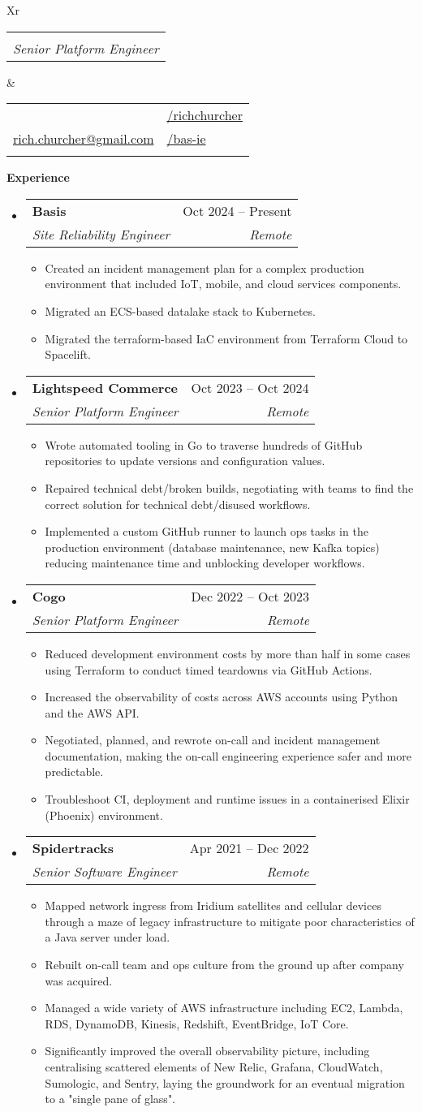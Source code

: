 \documentclass[12pt]{article}
\makeatletter
\def \fullname {Rich Churcher}
\def \subtitle {Senior Platform Engineer}
\def \linkedinicon {\faLinkedin}
\def \linkedinlink {https://linkedin.com/in/dwight-schrute/}
\def \linkedintext {/richchurcher}
\def \phoneicon {\faPhone}
\def \phonetext {+64-21-126-3919}
\def \emailicon {\faEnvelope}
\def \emaillink {mailto:rich.churcher@gmail.com}
\def \emailtext {rich.churcher@gmail.com}
\def \githubicon {\faGithub}
\def \githublink {https://github.com/bas-ie}
\def \githubtext {/bas-ie}
\def \headertype {\doublecol} %
\def \entryspacing {-0em}
\def \linkedin {\linkedinicon \hspace{1em}\href{\linkedinlink}{\linkedintext}}
\def \phone {\phoneicon \hspace{1em}{\phonetext}}
\def \email {\emailicon \hspace{1em}\href{\emaillink}{\emailtext}}
\def \github {\githubicon \hspace{1em}\href{\githublink}{\githubtext}}
\renewcommand{\section}[2]{\vspace{0.5ex}
  \colorbox{secondary}{\color{white}\raggedbottom\normalsize\textbf{{#1}{\hspace{0.5em}#2}}}
}
\newcommand{\resumeEntryStart}{\begin{itemize}[leftmargin=2.5mm]}
\newcommand{\resumeEntryEnd}{\end{itemize}\vspace{\entryspacing}}
\newcommand{\resumeItemListStart}{\begin{itemize}[leftmargin=4.5mm]}
\newcommand{\resumeItemListEnd}{\end{itemize}}
\newcommand{\resumeItem}[1]{
  \item\small{
    {#1 \vspace{-0.9ex}}
  }
}
\newcommand{\resumeEntryTSDL}[4]{
  \vspace{-0.5ex}\item[]
    \begin{tabularx}{0.97\textwidth}{X@{\hspace{5em}}r}
      \textbf{\color{primary}#1} & {\firabook\color{accent}\small#2} \\
      \textit{\color{accent}\small#3} & \textit{\color{accent}\small#4} \\
    \end{tabularx}\vspace{-0.9ex}
}
\newcommand{\doublecol}[6]{
  \begin{tabularx}{\textwidth}{Xr}
    {
      \begin{tabular}[c]{l}
        \fontsize{35}{45}\selectfont{\color{primary}{{\textbf{\fullname}}}} \\
          {\textit{\subtitle}}
      \end{tabular}\vspace{2ex}
    } & {
      \begin{tabular}[c]{l@{\hspace{1em}}l}
        {\small#4} & {\small#1} \\
        {\small#5} & {\small#2} \\
        {\small#6} & {\small#3}
      \end{tabular}
    }
  \end{tabularx}
}
\newcommand{\singlecol}[6]{
  \begin{tabularx}{\textwidth}{Xr}
    {
      \begin{tabular}[b]{l}
        \fontsize{35}{45}\selectfont{\color{primary}{{\textbf{\fullname}}}} \\
        {\textit{\subtitle}} %
      \end{tabular}
    } & {
      \begin{tabular}[c]{l}
        {\small#1} \\
        {\small#2} \\
        {\small#3} \\
        {\small#4} \\
        {\small#5} \\
        {\small#6}
      \end{tabular}
    }
  \end{tabularx}
}
\makeatother
\begin{document}
\headertype{\linkedin}{\github}{}{\phone}{\email}{}

\section{\faPieChart}{Experience}

  \resumeEntryStart
    \resumeEntryTSDL
      {Basis}{Oct 2024 -- Present}
      {Site Reliability Engineer}{Remote}
    \resumeItemListStart
      \resumeItem {Created an incident management plan for a complex production environment that included IoT, mobile, and cloud services components.}
      \resumeItem {Migrated an ECS-based datalake stack to Kubernetes.}
      \resumeItem {Migrated the terraform-based IaC environment from Terraform Cloud to Spacelift.}
    \resumeItemListEnd
  \resumeEntryEnd
  
  \resumeEntryStart
    \resumeEntryTSDL
      {Lightspeed Commerce}{Oct 2023 -- Oct 2024}
      {Senior Platform Engineer}{Remote}
    \resumeItemListStart
      \resumeItem {Wrote automated tooling in Go to traverse hundreds of GitHub repositories to update versions and configuration values.}
      \resumeItem {Repaired technical debt/broken builds, negotiating with teams to find the correct solution for technical debt/disused workflows.}
      \resumeItem {Implemented a custom GitHub runner to launch ops tasks in the production environment (database maintenance, new Kafka topics) reducing maintenance time and unblocking developer workflows.}
    \resumeItemListEnd
  \resumeEntryEnd
  
  \resumeEntryStart
    \resumeEntryTSDL
      {Cogo}{Dec 2022 -- Oct 2023}
      {Senior Platform Engineer}{Remote}
    \resumeItemListStart
      \resumeItem {Reduced development environment costs by more than half in some cases using Terraform to conduct timed teardowns via GitHub Actions.}
      \resumeItem {Increased the observability of costs across AWS accounts using Python and the AWS API.}
      \resumeItem {Negotiated, planned, and rewrote on-call and incident management documentation, making the on-call engineering experience safer and more predictable.}
      \resumeItem {Troubleshoot CI, deployment and runtime issues in a containerised Elixir (Phoenix) environment.}
    \resumeItemListEnd
  \resumeEntryEnd

  \resumeEntryStart
    \resumeEntryTSDL
      {Spidertracks}{Apr 2021 -- Dec 2022}
      {Senior Software Engineer}{Remote}
    \resumeItemListStart
      \resumeItem {Mapped network ingress from Iridium satellites and cellular devices through a maze of legacy infrastructure to mitigate poor characteristics of a Java server under load.}
      \resumeItem {Rebuilt on-call team and ops culture from the ground up after company was acquired.}
      \resumeItem {Managed a wide variety of AWS infrastructure including EC2, Lambda, RDS, DynamoDB, Kinesis, Redshift, EventBridge, IoT Core.}
      \resumeItem {Significantly improved the overall observability picture, including centralising scattered elements of New Relic, Grafana, CloudWatch, Sumologic, and Sentry, laying the groundwork for an eventual migration to a "single pane of glass".}
    \resumeItemListEnd
  \resumeEntryEnd
\end{document}
